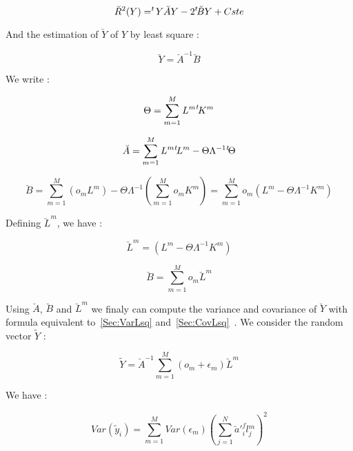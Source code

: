 \begin{equation}  
      \breve{R}^2 (Y) = ^{t} \! Y \breve{A} Y - 2  ^{t} \! \breve{B}  Y + Cste
\end{equation}


And the estimation of $\breve{Y}$ of $Y$ by least square : 


\begin{equation}  
      \breve{Y} =  \breve{A}^{-1}  \breve{B}
\end{equation}

We write :

\begin{equation}  
     \Theta =  \sum\limits_{m=1}^M {L^m} ^{t} \! {K^m}   
\end{equation}  


\begin{equation}  
     \breve{A} =  \sum\limits_{m=1}^M{L^m}{^{t} \! {L^m}} - \Theta \Lambda^{-1}   {^{t} \!} \Theta 
     \label{FinalBreveA}
\end{equation}  

\begin{equation}  
     \breve{B}  =   \sum\limits_{m=1}^M (o_m L^m ) 
                - \Theta \Lambda^{-1}  (\sum\limits_{m=1}^M o_m K^m )
               = \sum\limits_{m=1}^M  o_m (L^m -\Theta \Lambda^{-1} K^m)
     \label{FinalBreveB}
\end{equation}  

Defining $\breve{L}^m$, we have :

\begin{equation}  
     \breve{L}^m   =   (L^m  - \Theta  \Lambda^{-1} K^m)
\end{equation}  

\begin{equation}  
     \breve{B}  = \sum\limits_{m=1}^M  o_m \breve{L}^m
\end{equation}  


Using $\breve{A}$, $\breve{B}$  and $\breve{L}^m$ we finaly can compute the variance and
covariance of $\breve Y$ with formula equivalent to~\ref{Sec:VarLsq} and~\ref{Sec:CovLsq}~.
We consider the random vector $\tilde Y$ :

\begin{equation}  
     \tilde{Y}  =   \breve{A}^{-1}  \sum\limits_{m=1}^M  (o_m + \epsilon _m) \breve{L}^m
\end{equation}  

We have :

\begin{equation}
     Var(\tilde{y}_i) =  \sum\limits_{m=1}^M  Var(\epsilon _m)  (\sum\limits_{j=1}^N {\breve {a}'}{_i^j}  {\breve l}{^m_j})^2 
\label{Final:Var}
\end{equation}

